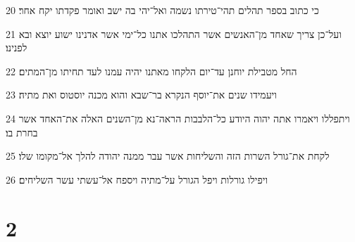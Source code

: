 \par 20 כי כתוב בספר תהלים תהי־טירתו נשמה ואל־יהי בה ישב ואומר פקדתו יקח אחר׃
\par 21 ועל־כן צריך שאחד מן־האנשים אשר התהלכו אתנו כל־ימי אשר אדנינו ישוע יוצא ובא לפנינו׃
\par 22 החל מטבילת יוחנן עד־יום הלקחו מאתנו יהיה עמנו לעד תחיתו מן־המתים׃
\par 23 ויעמידו שנים את־יוסף הנקרא בר־שבא והוא מכנה יוסטוס ואת מתיה׃
\par 24 ויתפללו ויאמרו אתה יהוה היודע כל־הלבבות הראה־נא מן־השנים האלה את־האחד אשר בחרת בו׃
\par 25 לקחת את־גורל השרות הזה והשליחות אשר עבר ממנה יהודה להלך אל־מקומו שלו׃
\par 26 ויפילו גורלות ויפל הגורל על־מתיה ויספח אל־עשתי עשר השליחים׃

\chapter{2}

